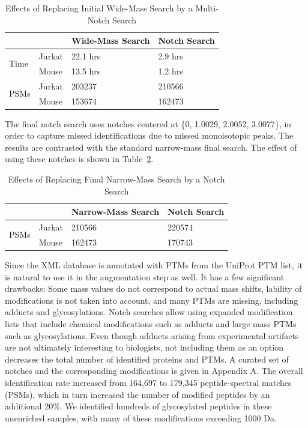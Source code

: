 \documentclass[journal=jprobs,manuscript=article]{achemso}
\begin{document}
\begin{table}[]
\centering
\caption{Effects of Replacing Initial Wide-Mass Search by a Multi-Notch Search}
\label{my-labelff}
\begin{tabular}{ll|l|l}
                      &        & Wide-Mass Search & Notch Search\\
\hline
\multirow{2}{*}{Time} & Jurkat & 22.1 hrs         & 2.9 hrs    \\
                      & Mouse  & 13.5 hrs         & 1.2 hrs   \\
\hline
\multirow{2}{*}{PSMs} & Jurkat & 203237           & 210566    \\
                      & Mouse  & 153674           & 162473   
\end{tabular}
\end{table}


The final notch search uses notches centered at \{0, 1.0029, 2.0052, 3.0077\}, in order to capture missed identifications due to missed monoisotopic peaks.
The results are contrasted with the standard narrow-mass final search.
The effect of using these notches is shown in Table~\ref{tab:table2}.

\begin{table}[]
\centering
\caption{Effects of Replacing Final Narrow-Mass Search by a Notch Search}
\label{tab:table2}
\begin{tabular}{ll|l|l}
                      &        & Narrow-Mass Search & Notch Search\\
\hline
\multirow{2}{*}{PSMs} & Jurkat  & 210566   &  220574  \\
                      & Mouse    & 162473   &   170743
\end{tabular}
\end{table}

Since the XML database is annotated with PTMs from the UniProt PTM list, it is natural to use it in the augmentation step as well.
It has a few significant drawbacks: Some mass values do not correspond to actual mass shifts, lability of modifications is not taken into account, and many PTMs are missing, including adducts and glycosylations.
Notch searches allow using expanded modification lists that include chemical modifications such as adducts and large mass PTMs such as glycosylations.
Even though adducts arising from experimental artifacts are not ultimately interesting to biologists, not including them as an option decreases the total number of identified proteins and PTMs.
A curated set of notches and the corresponding modifications is given in Appendix A.
The overall identification rate increased from 164,697 to 179,345 peptide-spectral matches (PSMs), which in turn increased the number of modified peptides by an additional 20\%.
We identified hundreds of glycosylated peptides in these unenriched samples, with many of these modifications exceeding 1000 Da.
\end{document}
